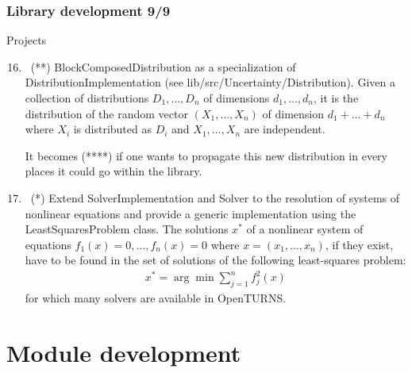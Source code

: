 \documentclass[8pt]{beamer}
\begin{document}
\begin{frame}
  \frametitle{Library development 9/9}
  \begin{block}{Projects}
    \begin{enumerate}
      \setcounter{enumi}{15}
    \item~(**) \alert{\ttfamily BlockComposedDistribution} as a specialization of {\ttfamily DistributionImplementation} (see {\ttfamily lib/src/Uncertainty/Distribution}). Given a collection of distributions $D_1,\dots,D_n$ of dimensions $d_1,\dots,d_n$, it is the distribution of the random vector $(X_1,\dots,X_n)$ of dimension $d_1+\dots+d_n$ where $X_i$ is distributed as $D_i$ and $X_1,\dots,X_n$ are independent.

      It becomes (****) if one wants to propagate this new distribution in every places it could go within the library.
    \item~(*) Extend \alert{\ttfamily SolverImplementation} and \alert{\ttfamily Solver} to the resolution of systems of nonlinear equations and provide a generic implementation using the \alert{\ttfamily LeastSquaresProblem} class. The solutions $x^*$ of a nonlinear system of equations $f_1(x)=0,\dots,f_n(x)=0$ where $x=(x_1,\dots,x_n)$, if they exist, have to be found in the set of solutions of the following least-squares problem:
      \begin{align}
        x^*=\arg\min \sum_{j=1}^n f_j^2(x)
      \end{align}
      for which many solvers are available in OpenTURNS.
    \end{enumerate}
  \end{block}
\end{frame}

\section{Module development}
\end{document}
